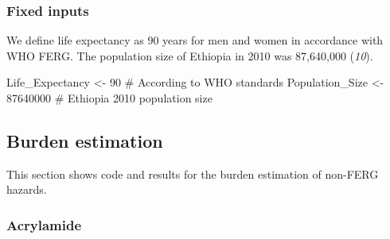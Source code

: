 \documentclass[
  letterpaper,
  DIV=11,
  numbers=noendperiod]{scrartcl}
\newenvironment{Shaded}{\begin{snugshade}}{\end{snugshade}}
\newcommand{\CommentTok}[1]{\textcolor[rgb]{0.37,0.37,0.37}{#1}}
\newcommand{\DecValTok}[1]{\textcolor[rgb]{0.68,0.00,0.00}{#1}}
\newcommand{\NormalTok}[1]{\textcolor[rgb]{0.00,0.23,0.31}{#1}}
\newcommand{\OtherTok}[1]{\textcolor[rgb]{0.00,0.23,0.31}{#1}}
\begin{document}
\subsubsection{Fixed inputs}\label{fixed-inputs}

We define life expectancy as 90 years for men and women in accordance
with WHO FERG. The population size of Ethiopia in 2010 was 87,640,000
(\emph{10}).

\begin{Shaded}
\begin{Highlighting}[]
\NormalTok{Life\_Expectancy }\OtherTok{\textless{}{-}} \DecValTok{90} \CommentTok{\# According to WHO standards}
\NormalTok{Population\_Size }\OtherTok{\textless{}{-}} \DecValTok{87640000} \CommentTok{\# Ethiopia 2010 population size}
\end{Highlighting}
\end{Shaded}

\subsection{Burden estimation}\label{burden-estimation}

This section shows code and results for the burden estimation of
non-FERG hazards.

\subsubsection{Acrylamide}\label{acrylamide}
\end{document}
